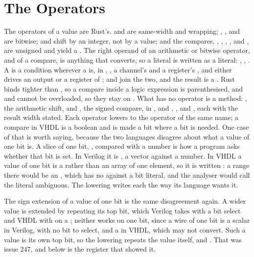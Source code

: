 \section{The Operators}
\label{sec:x-ops}

The operators of a value are Rust's. \code{+} and \code{-} are
same-width and wrapping; \code{\&}, \code{|}, \code{\^{}} and
\code{!} are bitwise; \code{<<} and \code{>>} shift by an integer,
not by a value; and the compares, \code{==}, \code{!=}, \code{<},
\code{<=}, \code{>} and \code{>=}, are unsigned and yield a
. The right operand of an arithmetic or bitwise operator,
and of a compare, is anything that converts, so a literal is written
as a literal: , , . A
 is a condition wherever a  is, in ,
, a channel's  and a register's
, and either drives an output or a register of
; \code{\&} and \code{|} join the two, and the result is a
. Rust binds \code{\&} tighter than \code{==}, so a compare
inside a logic expression is parenthesised, and \code{\&\&} and
\code{||} cannot be overloaded, so they stay on . What has
no operator is a method: , the arithmetic shift, and
, the signed compare, in , and
, ,  and
, each with the result width stated.
Each operator lowers to the operator of the same name; a compare in
VHDL is a boolean and is made a bit where a bit is needed. One case
of that is worth saying, because the two languages disagree about
what a value of one bit is. A slice of one bit, , compared with a number is how a program asks whether that bit
is set. In Verilog it is , a vector against a
number. In VHDL a value of one bit is a  rather than
an array of one element, so it is written : a range
there would be an , which has no \code{=} against a
bit literal, and the analyser would call the literal ambiguous. The
lowering writes each the way its language wants it.

The sign extension of a value of one bit is the same disagreement
again. A wider value is extended by repeating its top bit, which
Verilog takes with a bit select and VHDL with  on a
; neither works on one bit, since a wire of one bit is a
scalar in Verilog, with no bit to select, and a  in
VHDL, which  may not convert. Such a value is its own top
bit, so the lowering repeats the value itself,  and . That was issue 247,
and  below is the register that showed it.

